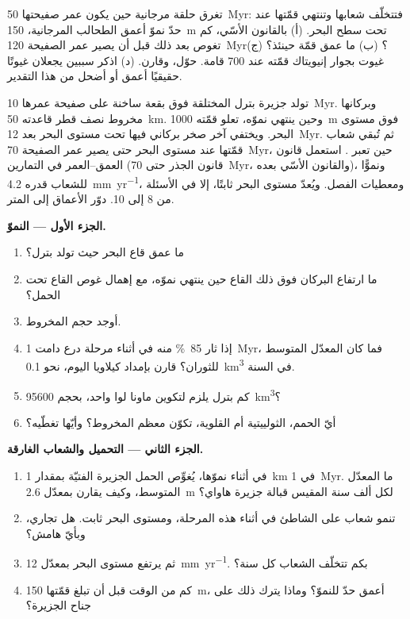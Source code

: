\begin{exercise}[$\star\star\star$]\label{exo:b2:oceanic-islands:12}
تغرق حلقة مرجانية حين يكون عمر صفيحتها \qty{50}{Myr}: فتتخلّف شعابها وتنتهي قمّتها عند
حدّ نموّ أعمق الطحالب المرجانية، \qty{150}{m} تحت سطح البحر. (أ) بالقانون
الأسّي، كم تغوص بعد ذلك قبل أن يصير عمر الصفيحة \qty{120}{Myr}؟ (ب) ما عمق قمّة
 حينئذ؟ (ج) غيوت بجوار إنيويتاك قمّته عند 700 قامة. حوّل، وقارن.
(د) اذكر سببين يجعلان غيوتًا حقيقيًا أعمق أو أضحل من هذا التقدير.
\end{exercise}

\begin{problem}\label{pb:b2:oceanic-islands:1}
تولد جزيرة بترل المختلقة فوق بقعة ساخنة على صفيحة عمرها \qty{10}{Myr}. وبركانها
مخروط نصف قطر قاعدته \qty{50}{km}. وحين ينتهي نموّه، تعلو قمّته \qty{1000}{m} فوق
مستوى البحر. ويختفي آخر صخر بركاني فيها تحت مستوى البحر بعد \qty{12}{Myr}. ثم تُبقي
شعاب قمّتها عند مستوى البحر حتى يصير عمر الصفيحة \qty{70}{Myr}، حين تعبر 
. استعمل قانون العمق--العمر في التمارين (قانون الجذر حتى \qty{70}{Myr}، والقانون
الأسّي بعده)، ونموًّا للشعاب قدره \qty{4.2}{mm.yr^{-1}}، ومعطيات الفصل.
ويُعدّ مستوى البحر ثابتًا، إلا في الأسئلة من 8 إلى 10. دوّر الأعماق إلى المتر.

\noindent\textbf{الجزء الأول --- النموّ.}
\begin{enumerate}
  \item ما عمق قاع البحر حيث تولد بترل؟
  \item ما ارتفاع البركان فوق ذلك القاع حين ينتهي نموّه، مع إهمال
        غوص القاع تحت الحمل؟
  \item أوجد حجم المخروط.
  \item إذا ثار \qty{85}{\percent} منه في أثناء مرحلة درع دامت \qty{1}{Myr}، فما كان
        المعدّل المتوسط للثوران؟ قارن بإمداد كيلاويا اليوم، نحو
        \qty{0.1}{km^3} في السنة.
  \item كم بترل يلزم لتكوين ماونا لوا واحد، بحجم \qty{95600}{km^3}؟
  \item أيّ الحمم، الثولييتية أم القلوية، تكوّن معظم المخروط؟ وأيّها تغطّيه؟
\end{enumerate}

\noindent\textbf{الجزء الثاني --- التحميل والشعاب الغارقة.}
\begin{enumerate}[resume]
  \item في أثناء نموّها، يُغوِّص الحمل الجزيرة الفتيّة بمقدار \qty{1}{km} في \qty{1}{Myr}. ما
        المعدّل المتوسط، وكيف يقارن بمعدّل \qty{2.6}{m} لكل ألف سنة المقيس
        قبالة جزيرة هاواي؟
  \item تنمو شعاب على الشاطئ في أثناء هذه المرحلة، ومستوى البحر ثابت. هل تجاري،
        وبأيّ هامش؟
  \item ثم يرتفع مستوى البحر بمعدّل \qty{12}{mm.yr^{-1}}. بكم تتخلّف الشعاب كل
        سنة؟
  \item كم من الوقت قبل أن تبلغ قمّتها \qty{150}{m}، أعمق حدّ للنموّ؟ وماذا يترك ذلك
        على جناح الجزيرة؟
\end{enumerate}


\end{problem}
